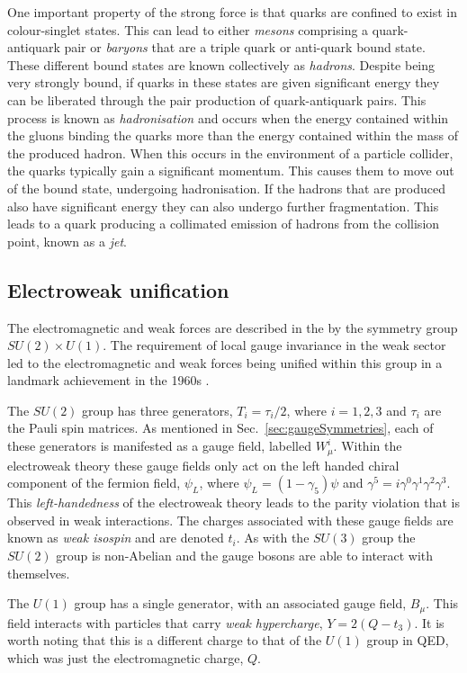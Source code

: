 One important property of the strong force is that quarks are
confined to exist in colour-singlet states. This can lead to either
\emph{mesons} comprising a quark-antiquark pair or \emph{baryons} that are a
triple quark or anti-quark bound state. These different bound states are known
collectively as \emph{hadrons}. Despite being very strongly bound, if
quarks in these states are given significant energy they can be
liberated through the pair production of quark-antiquark pairs. This
process is known as \emph{hadronisation} and occurs when the energy
contained within the gluons binding the quarks more than the energy
contained within the mass of the produced hadron. When this occurs in
the environment of a particle collider, the quarks typically gain a
significant momentum. This causes them to move out of the bound state,
undergoing hadronisation. If the hadrons that are produced also have
significant energy they can also undergo further fragmentation. This
leads to a quark producing a collimated emission of hadrons from
the collision point, known as a \emph{jet}.

\subsection{Electroweak unification}

The electromagnetic and weak forces are described in the \SM by the
symmetry group $SU(2)\times U(1)$. The requirement of local gauge
invariance in the weak sector led to the electromagnetic and weak
forces being unified within this group in a landmark achievement in
the 1960s \cite{Glashow:1961tr,PhysRevLett.19.1264,Salam:1964ry}.

The $SU(2)$ group has three generators, $T_i=\tau_i/2$, where
$i=1,2,3$ and $\tau_i$ are the Pauli spin matrices. As mentioned in
Sec.~\ref{sec:gaugeSymmetries}, each of these generators is manifested
as a gauge field, labelled $W_{\mu}^i$. Within the electroweak theory
these gauge fields only act on the left handed chiral component of the
fermion field, $\psi_L$, where $\psi_L = (1-\gamma_5)\psi$ and
$\gamma^5=i\gamma^0\gamma^1\gamma^2\gamma^3$. This 
\emph{left-handedness} of the electroweak theory leads to the parity violation
that is observed in weak interactions. The charges associated with
these gauge fields are known as \emph{weak isospin} and are denoted
$t_i$. As with the $SU(3)$ group the $SU(2)$ group is non-Abelian and
the gauge bosons are able to interact with themselves.

The $U(1)$ group has a single generator, with an associated gauge
field, $B_{\mu}$. This field interacts with particles that
carry \emph{weak hypercharge}, $Y=2(Q-t_3)$. It is worth noting that this
is a different charge to that of the $U(1)$ group in \ac{QED}, which was
just the electromagnetic charge, $Q$. 

